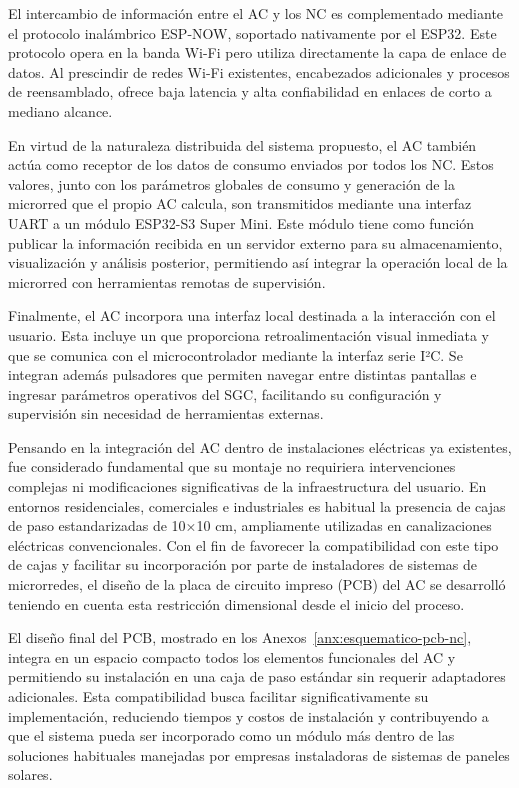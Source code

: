 El intercambio de información entre el AC y los NC es complementado mediante el protocolo inalámbrico ESP-NOW, soportado nativamente por el ESP32. Este protocolo opera en la banda Wi-Fi pero utiliza directamente la capa de enlace de datos. Al prescindir de redes Wi-Fi existentes, encabezados adicionales y procesos de reensamblado, ofrece baja latencia y alta confiabilidad en enlaces de corto a mediano alcance.

En virtud de la naturaleza distribuida del sistema propuesto, el AC también actúa como receptor de los datos de consumo enviados por todos los NC. Estos valores, junto con los parámetros globales de consumo y generación de la microrred que el propio AC calcula, son transmitidos mediante una interfaz UART a un módulo ESP32-S3 Super Mini. Este módulo tiene como función publicar la información recibida en un servidor externo para su almacenamiento, visualización y análisis posterior, permitiendo así integrar la operación local de la microrred con herramientas remotas de supervisión.

Finalmente, el AC incorpora una interfaz local destinada a la interacción con el usuario. Esta incluye un  que proporciona retroalimentación visual inmediata y que se comunica con el microcontrolador mediante la interfaz serie I²C. Se integran además pulsadores que permiten navegar entre distintas pantallas e ingresar parámetros operativos del SGC, facilitando su configuración y supervisión sin necesidad de herramientas externas.

Pensando en la integración del AC dentro de instalaciones eléctricas ya existentes, fue considerado fundamental que su montaje no requiriera intervenciones complejas ni modificaciones significativas de la infraestructura del usuario. En entornos residenciales, comerciales e industriales es habitual la presencia de cajas de paso estandarizadas de 10×10 cm, ampliamente utilizadas en canalizaciones eléctricas convencionales. Con el fin de favorecer la compatibilidad con este tipo de cajas y facilitar su incorporación por parte de instaladores de sistemas de microrredes, el diseño de la placa de circuito impreso (PCB) del AC se desarrolló teniendo en cuenta esta restricción dimensional desde el inicio del proceso.

El diseño final del PCB, mostrado en los Anexos~\ref{anx:esquematico-pcb-nc}, integra en un espacio compacto todos los elementos funcionales del AC y permitiendo su instalación en una caja de paso estándar sin requerir adaptadores adicionales. Esta compatibilidad busca facilitar significativamente su implementación, reduciendo tiempos y costos de instalación y contribuyendo a que el sistema pueda ser incorporado como un módulo más dentro de las soluciones habituales manejadas por empresas instaladoras de sistemas de paneles solares.

